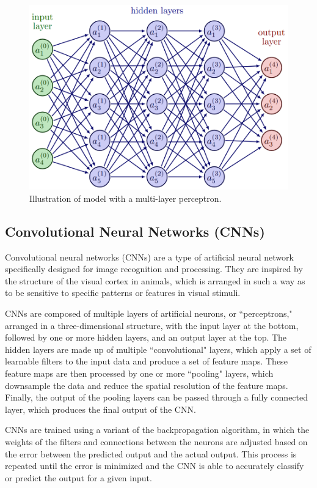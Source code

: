 \documentclass{book}
\begin{document}
	\begin{figure}[h!]
		\centering
		\includegraphics[width=0.7\columnwidth]{resources/chapter3/mlp.png}
		\caption{Illustration of model with a multi-layer perceptron. \cite{tikz_neural_networks}}
		\label{fig:Multilayer Perceptron}
	\end{figure}
	
	\subsection{Convolutional Neural Networks (CNNs)}
	Convolutional neural networks (CNNs) are a type of artificial neural network specifically designed for image recognition and processing. They are inspired by the structure of the visual cortex in animals, which is arranged in such a way as to be sensitive to specific patterns or features in visual stimuli.
	
	CNNs are composed of multiple layers of artificial neurons, or ``perceptrons," arranged in a three-dimensional structure, with the input layer at the bottom, followed by one or more hidden layers, and an output layer at the top. The hidden layers are made up of multiple ``convolutional" layers, which apply a set of learnable filters to the input data and produce a set of feature maps. These feature maps are then processed by one or more ``pooling" layers, which downsample the data and reduce the spatial resolution of the feature maps. Finally, the output of the pooling layers can be passed through a fully connected layer, which produces the final output of the CNN.
	
	CNNs are trained using a variant of the backpropagation algorithm, in which the weights of the filters and connections between the neurons are adjusted based on the error between the predicted output and the actual output. This process is repeated until the error is minimized and the CNN is able to accurately classify or predict the output for a given input.
	
\end{document}
